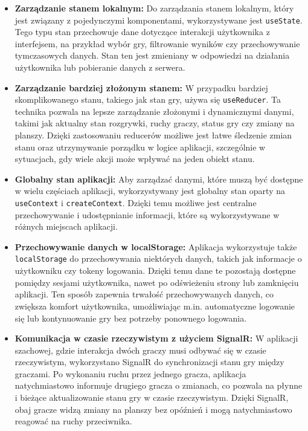 \documentclass[12pt,a4paper]{article}
\begin{document}
\begin{itemize}
    \item \textbf{Zarządzanie stanem lokalnym:} Do zarządzania stanem lokalnym, który jest związany z pojedynczymi komponentami, wykorzystywane jest \texttt{useState}. Tego typu stan przechowuje dane dotyczące interakcji użytkownika z interfejsem, na przykład wybór gry, filtrowanie wyników czy przechowywanie tymczasowych danych. Stan ten jest zmieniany w odpowiedzi na działania użytkownika lub pobieranie danych z serwera.

    \item \textbf{Zarządzanie bardziej złożonym stanem:} W przypadku bardziej skomplikowanego stanu, takiego jak stan gry, używa się \texttt{useReducer}. Ta technika pozwala na lepsze zarządzanie złożonymi i dynamicznymi danymi, takimi jak aktualny stan rozgrywki, ruchy graczy, status gry czy zmiany na planszy. Dzięki zastosowaniu reducerów możliwe jest łatwe śledzenie zmian stanu oraz utrzymywanie porządku w logice aplikacji, szczególnie w sytuacjach, gdy wiele akcji może wpływać na jeden obiekt stanu.

    \item \textbf{Globalny stan aplikacji:} Aby zarządzać danymi, które muszą być dostępne w wielu częściach aplikacji, wykorzystywany jest globalny stan oparty na \texttt{useContext} i \texttt{createContext}. Dzięki temu możliwe jest centralne przechowywanie i udostępnianie informacji, które są wykorzystywane w różnych miejscach aplikacji.

    \item \textbf{Przechowywanie danych w localStorage:} Aplikacja wykorzystuje także \texttt{localStorage} do przechowywania niektórych danych, takich jak informacje o użytkowniku czy tokeny logowania. Dzięki temu dane te pozostają dostępne pomiędzy sesjami użytkownika, nawet po odświeżeniu strony lub zamknięciu aplikacji. Ten sposób zapewnia trwałość przechowywanych danych, co zwiększa komfort użytkownika, umożliwiając m.in. automatyczne logowanie się lub kontynuowanie gry bez potrzeby ponownego logowania.

    \item \textbf{Komunikacja w czasie rzeczywistym z użyciem SignalR:}
    W aplikacji szachowej, gdzie interakcja dwóch graczy musi odbywać się w czasie rzeczywistym, wykorzystano SignalR do synchronizacji stanu gry między graczami. Po wykonaniu ruchu przez jednego gracza, aplikacja natychmiastowo informuje drugiego gracza o zmianach, co pozwala na płynne i bieżące aktualizowanie stanu gry w czasie rzeczywistym. Dzięki SignalR, obaj gracze widzą zmiany na planszy bez opóźnień i mogą natychmiastowo reagować na ruchy przeciwnika.

\end{itemize}
\end{document}
